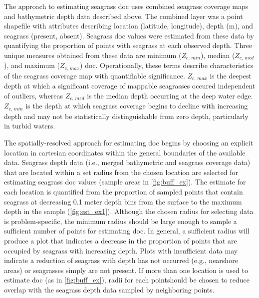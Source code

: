 \documentclass[letterpaper,12pt,oneside]{article}\usepackage[]{graphicx}\usepackage[]{color}
\begin{document}
The approach to estimating seagrass \acl{doc} uses combined seagrass coverage maps and bathymetric depth data described above.  The combined layer was a point shapefile with attributes describing location (latitude, longitude), depth (m), and seagrass (present, absent).  Seagrass \ac{doc} values were estimated from these data by quantifying the proportion of points with seagrass at each observed depth.  Three unique measures obtained from these data are minimum ($Z_{c,\,min}$), median ($Z_{c,\,med}$), and maximum ($Z_{c,\,max}$) \acl{doc}.  Operationally, these terms describe characteristics of the seagrass coverage map with quantifiable significance. $Z_{c,\,max}$ is the deepest depth at which a significant coverage of mappable seagrasses occured independent of outliers, whereas  $Z_{c,\,med}$ is the median depth occurring at the deep water edge. $Z_{c,\,min}$ is the depth at which seagrass coverage begins to decline with increasing depth and may not be statistically distinguishable from zero depth, particularly in turbid waters.

The spatially-resolved approach for estimating \ac{doc} begins by choosing an explicit location in cartesian coordinates within the general boundaries of the available data.  Seagrass depth data (i.e., merged bathymetric and seagrass coverage data) that are located within a set radius from the chosen location are selected for estimating seagrass \ac{doc} values (sample areas in \cref{fig:buff_ex}). The estimate for each location is quantified from the proportion of sampled points that contain seagrass at decreasing 0.1 meter depth bins from the surface to the maximum depth in the sample (\cref{fig:est_ex1}).  Although the chosen radius for selecting data is problem-specific, the minimum radius should be large enough to sample a sufficient number of points for estimating \ac{doc}.  In general, a sufficient radius will produce a plot that indicates a decrease in the proportion of points that are occupied by seagrass with increasing depth. Plots with insufficient data may indicate a reduction of seagrass with depth has not occurred (e.g.,  nearshore areas) or seagrasses simply are not present.  If more than one location is used to estimate \ac{doc} (as in \cref{fig:buff_ex}), radii for each pointshould be chosen to reduce overlap with the seagrass depth data sampled by neighboring points.     
\end{document}
